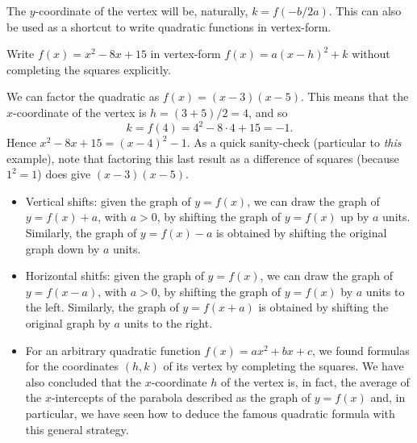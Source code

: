 \documentclass{ximera}
\begin{document}
The $y$-coordinate of the vertex will be, naturally, $k = f(-b/2a)$. This can also be used as a shortcut to write quadratic functions in vertex-form.

\begin{example}
  Write $f(x) = x^2 - 8x+15$ in vertex-form $f(x) = a(x-h)^2+k$ without completing the squares explicitly.\\[.5em]
  \begin{explanation}
    We can factor the quadratic as $f(x) = (x-3)(x-5)$. This means that the $x$-coordinate of the vertex is $h = (3+5)/2 = 4$, and so $$k =f(4) = 4^2-8\cdot 4 + 15 = -1.$$Hence $x^2-8x+15 = (x-4)^2-1$. As a quick sanity-check (particular to \emph{this} example), note that factoring this last result as a difference of squares (because $1^2=1$) does give $(x-3)(x-5)$.
  \end{explanation}
\end{example}


\begin{summary}\begin{itemize}
\item Vertical shifts: given the graph of $y=f(x)$, we can draw the graph of $y=f(x)+a$, with $a>0$, by shifting the graph of $y=f(x)$ up by $a$ units. Similarly, the graph of $y=f(x)-a$ is obtained by shifting the original graph down by $a$ units.
\item Horizontal shitfs: given the graph of $y=f(x)$, we can draw the graph of $y=f(x-a)$, with $a>0$, by shifting the graph of $y=f(x)$ by $a$ units to the left. Similarly, the graph of $y=f(x+a)$ is obtained by shifting the original graph by $a$ units to the right.
\item For an arbitrary quadratic function $f(x) = ax^2+bx+c$, we found formulas for the coordinates $(h,k)$ of its vertex by completing the squares. We have also concluded that the $x$-coordinate $h$ of the vertex is, in fact, the average of the $x$-intercepts of the parabola described as the graph of $y=f(x)$ and, in particular, we have seen how to deduce the famous quadratic formula with this general strategy.
\end{itemize}\end{summary}
\end{document}
